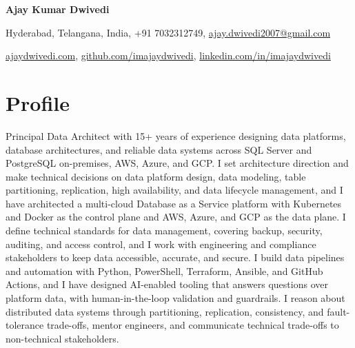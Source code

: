 \documentclass[10pt,a4paper]{article}
\begin{document}
\begin{center}
{\Huge\bfseries Ajay Kumar Dwivedi}

\vspace{6pt}
Hyderabad, Telangana, India, +91 7032312749, \href{mailto:ajay.dwivedi2007@gmail.com}{ajay.dwivedi2007@gmail.com}

\vspace{2pt}
\href{https://ajaydwivedi.com/}{ajaydwivedi.com}, \href{https://github.com/imajaydwivedi}{github.com/imajaydwivedi}, \href{https://linkedin.com/in/imajaydwivedi/}{linkedin.com/in/imajaydwivedi}
\end{center}

\section{Profile}
Principal Data Architect with 15+ years of experience designing data platforms, database architectures, and reliable data systems across SQL Server and PostgreSQL on-premises, AWS, Azure, and GCP. I set architecture direction and make technical decisions on data platform design, data modeling, table partitioning, replication, high availability, and data lifecycle management, and I have architected a multi-cloud Database as a Service platform with Kubernetes and Docker as the control plane and AWS, Azure, and GCP as the data plane. I define technical standards for data management, covering backup, security, auditing, and access control, and I work with engineering and compliance stakeholders to keep data accessible, accurate, and secure. I build data pipelines and automation with Python, PowerShell, Terraform, Ansible, and GitHub Actions, and I have designed AI-enabled tooling that answers questions over platform data, with human-in-the-loop validation and guardrails. I reason about distributed data systems through partitioning, replication, consistency, and fault-tolerance trade-offs, mentor engineers, and communicate technical trade-offs to non-technical stakeholders.
\end{document}
